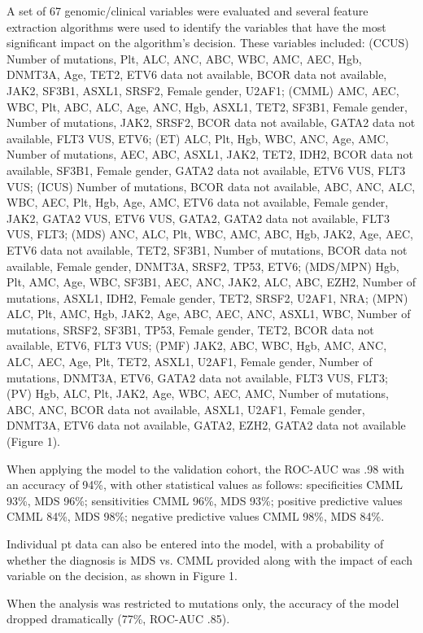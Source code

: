 A set of 67 genomic/clinical variables were evaluated and several feature extraction algorithms were used to identify the variables that have the most significant impact on the algorithm's decision. These variables included: (CCUS) Number of mutations, Plt, ALC, ANC, ABC, WBC, AMC, AEC, Hgb, DNMT3A, Age, TET2, ETV6 data not available, BCOR data not available, JAK2, SF3B1, ASXL1, SRSF2, Female gender, U2AF1; (CMML) AMC, AEC, WBC, Plt, ABC, ALC, Age, ANC, Hgb, ASXL1, TET2, SF3B1, Female gender, Number of mutations, JAK2, SRSF2, BCOR data not available, GATA2 data not available, FLT3 VUS, ETV6; (ET) ALC, Plt, Hgb, WBC, ANC, Age, AMC, Number of mutations, AEC, ABC, ASXL1, JAK2, TET2, IDH2, BCOR data not available, SF3B1, Female gender, GATA2 data not available, ETV6 VUS, FLT3 VUS; (ICUS) Number of mutations, BCOR data not available, ABC, ANC, ALC, WBC, AEC, Plt, Hgb, Age, AMC, ETV6 data not available, Female gender, JAK2, GATA2 VUS, ETV6 VUS, GATA2, GATA2 data not available, FLT3 VUS, FLT3; (MDS) ANC, ALC, Plt, WBC, AMC, ABC, Hgb, JAK2, Age, AEC, ETV6 data not available, TET2, SF3B1, Number of mutations, BCOR data not available, Female gender, DNMT3A, SRSF2, TP53, ETV6; (MDS/MPN) Hgb, Plt, AMC, Age, WBC, SF3B1, AEC, ANC, JAK2, ALC, ABC, EZH2, Number of mutations, ASXL1, IDH2, Female gender, TET2, SRSF2, U2AF1, NRA; (MPN) ALC, Plt, AMC, Hgb, JAK2, Age, ABC, AEC, ANC, ASXL1, WBC, Number of mutations, SRSF2, SF3B1, TP53, Female gender, TET2, BCOR data not available, ETV6, FLT3 VUS; (PMF) JAK2, ABC, WBC, Hgb, AMC, ANC, ALC, AEC, Age, Plt, TET2, ASXL1, U2AF1, Female gender, Number of mutations, DNMT3A, ETV6, GATA2 data not available, FLT3 VUS, FLT3; (PV) Hgb, ALC, Plt, JAK2, Age, WBC, AEC, AMC, Number of mutations, ABC, ANC, BCOR data not available, ASXL1, U2AF1, Female gender, DNMT3A, ETV6 data not available, GATA2, EZH2, GATA2 data not available (Figure 1).

When applying the model to the validation cohort, the ROC-AUC was .98 with an accuracy of 94\%, with other statistical values as follows: specificities CMML 93\%, MDS 96\%; sensitivities CMML 96\%, MDS 93\%; positive predictive values CMML 84\%, MDS 98\%; negative predictive values CMML 98\%, MDS 84\%.

Individual pt data can also be entered into the model, with a probability of whether the diagnosis is MDS vs. CMML provided along with the impact of each variable on the decision, as shown in Figure 1.

When the analysis was restricted to mutations only, the accuracy of the model dropped dramatically (77\%, ROC-AUC .85).


